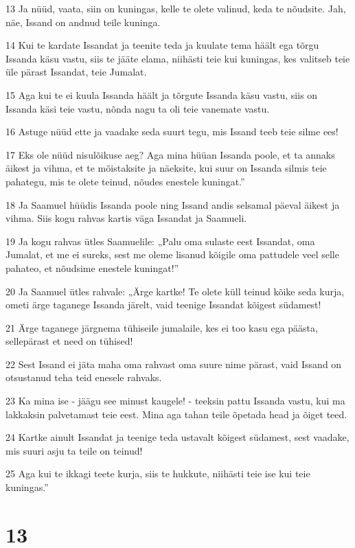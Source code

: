 \par 13 Ja nüüd, vaata, siin on kuningas, kelle te olete valinud, keda te nõudsite. Jah, näe, Issand on andnud teile kuninga.
\par 14 Kui te kardate Issandat ja teenite teda ja kuulate tema häält ega tõrgu Issanda käsu vastu, siis te jääte elama, niihästi teie kui kuningas, kes valitseb teie üle pärast Issandat, teie Jumalat.
\par 15 Aga kui te ei kuula Issanda häält ja tõrgute Issanda käsu vastu, siis on Issanda käsi teie vastu, nõnda nagu ta oli teie vanemate vastu.
\par 16 Astuge nüüd ette ja vaadake seda suurt tegu, mis Issand teeb teie silme ees!
\par 17 Eks ole nüüd nisulõikuse aeg? Aga mina hüüan Issanda poole, et ta annaks äikest ja vihma, et te mõistaksite ja näeksite, kui suur on Issanda silmis teie pahategu, mis te olete teinud, nõudes enestele kuningat.”
\par 18 Ja Saamuel hüüdis Issanda poole ning Issand andis selsamal päeval äikest ja vihma. Siis kogu rahvas kartis väga Issandat ja Saamueli.
\par 19 Ja kogu rahvas ütles Saamuelile: „Palu oma sulaste eest Issandat, oma Jumalat, et me ei sureks, sest me oleme lisanud kõigile oma pattudele veel selle pahateo, et nõudsime enestele kuningat!”
\par 20 Ja Saamuel ütles rahvale: „Ärge kartke! Te olete küll teinud kõike seda kurja, ometi ärge taganege Issanda järelt, vaid teenige Issandat kõigest südamest!
\par 21 Ärge taganege järgnema tühiseile jumalaile, kes ei too kasu ega päästa, sellepärast et need on tühised!
\par 22 Sest Issand ei jäta maha oma rahvast oma suure nime pärast, vaid Issand on otsustanud teha teid enesele rahvaks.
\par 23 Ka mina ise - jäägu see minust kaugele! - teeksin pattu Issanda vastu, kui ma lakkaksin palvetamast teie eest. Mina aga tahan teile õpetada head ja õiget teed.
\par 24 Kartke ainult Issandat ja teenige teda ustavalt kõigest südamest, sest vaadake, mis suuri asju ta teile on teinud!
\par 25 Aga kui te ikkagi teete kurja, siis te hukkute, niihästi teie ise kui teie kuningas.”

\chapter{13}

